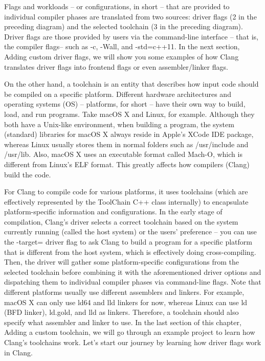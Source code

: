 Flags and workloads – or configurations, in short – that are provided to individual compiler phases are translated from two sources: driver flags (2 in the preceding diagram) and the selected toolchain (3 in the preceding diagram). Driver flags are those provided by users via the command-line interface – that is, the compiler flags– such as -c, -Wall, and -std=c++11. In the next section, Adding custom driver flags, we will show you some examples of how Clang translates driver flags into frontend flags or even assembler/linker flags.

On the other hand, a toolchain is an entity that describes how input code should be compiled on a specific platform. Different hardware architectures and operating systems (OS) – platforms, for short – have their own way to build, load, and run programs. Take macOS X and Linux, for example. Although they both have a Unix-like environment, when building a program, the system (standard) libraries for macOS X always reside in Apple's XCode IDE package, whereas Linux usually stores them in normal folders such as /usr/include and /usr/lib. Also, macOS X uses an executable format called Mach-O, which is different from Linux's ELF format. This greatly affects how compilers (Clang) build the code.

For Clang to compile code for various platforms, it uses toolchains (which are effectively represented by the ToolChain C++ class internally) to encapsulate platform-specific information and configurations. In the early stage of compilation, Clang's driver selects a correct toolchain based on the system currently running (called the host system) or the users' preference – you can use the -target= driver flag to ask Clang to build a program for a specific platform that is different from the host system, which is effectively doing cross-compiling. Then, the driver will gather some platform-specific configurations from the selected toolchain before combining it with the aforementioned driver options and dispatching them to individual compiler phases via command-line flags. Note that different platforms usually use different assemblers and linkers. For example, macOS X can only use ld64 and lld linkers for now, whereas Linux can use ld (BFD linker), ld.gold, and lld as linkers. Therefore, a toolchain should also specify what assembler and linker to use. In the last section of this chapter, Adding a custom toolchain, we will go through an example project to learn how Clang's toolchains work. Let's start our journey by learning how driver flags work in Clang.






























